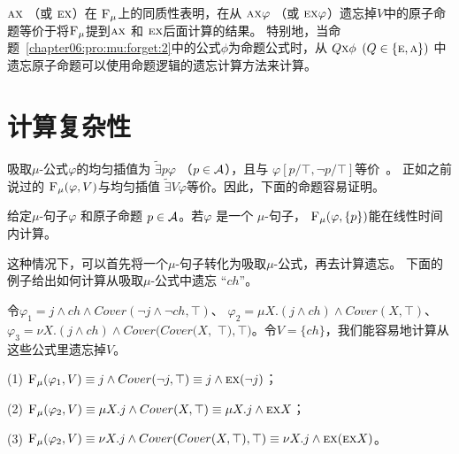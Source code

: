  $\textsc{a}\textsc{x}$ （或 $\textsc{e}\textsc{x}$）在 ${\textsc{F}_{\textsc{$\mu$}}}$上的同质性表明，在从 $\textsc{a}\textsc{x} \varphi$ （或 $\textsc{e}\textsc{x} \varphi$）遗忘掉$V$中的原子命题等价于将${\textsc{F}_{\textsc{$\mu$}}}$提到$\textsc{a}\textsc{x}$ 和 $\textsc{e} \textsc{x}$后面计算的结果。
特别地，当命题~\ref{chapter06:pro:mu:forget:2}中的公式$\phi$为命题公式时，从
$Q\textsc{x} \phi$ $(Q\in \{\textsc{e}, \textsc{a}\})$ 中遗忘原子命题可以使用命题逻辑的遗忘计算方法来计算。

\section{计算复杂性}
吸取$\mu$-公式$\varphi$的均匀插值为 $\widetilde{\exists}p \varphi$ （$p\in {\cal A}$），且与 $\varphi[p/\top,\neg p/\top]$等价~\cite{d2006modal}。
正如之前说过的 ${\textsc{F}_{\textsc{$\mu$}}}(\varphi, V)$与均匀插值 $\widetilde{\exists}V \varphi$等价\cite{d2006modal}。因此，下面的命题容易证明。
\begin{proposition}\label{pro:disLiT}
	给定$\mu$-句子$\varphi$ 和原子命题 $p\in {\cal A}$。若$\varphi$ 是一个 $\mu$-句子， ${\textsc{F}_{\textsc{$\mu$}}}(\varphi, \{p\})$能在线性时间内计算。
\end{proposition}

这种情况下，可以首先将一个$\mu$-句子转化为吸取$\mu$-公式，再去计算遗忘。
下面的例子给出如何计算从吸取$\mu$-公式中遗忘 “$ch$”。
\begin{example}
	令$\varphi_1=  j \wedge ch \wedge Cover(\neg j \wedge \neg ch, \top)$、 $ \varphi_2= \mu X. (j \wedge ch) \wedge Cover(X, \top)$、 $\varphi_3=  \nu X. (j \wedge ch) \wedge Cover(Cover(X,$ $\top), \top)$。令$V=\{ch\}$，我们能容易地计算从这些公式里遗忘掉$V$。
	
	(1) ${\textsc{F}_{\textsc{$\mu$}}}(\varphi_1, V) \equiv j \wedge Cover(\neg j, \top) \equiv j \wedge \textsc{e} \textsc{x}(\neg j)$；
	
	(2) ${\textsc{F}_{\textsc{$\mu$}}}(\varphi_2, V) \equiv \mu X. j  \wedge Cover(X, \top) \equiv \mu X. j \wedge \textsc{e} \textsc{x} X$；
	
	(3) ${\textsc{F}_{\textsc{$\mu$}}}(\varphi_2, V) \equiv \nu X. j \wedge Cover(Cover(X, \top), \top) \equiv \nu X. j \wedge \textsc{e} \textsc{x}(\textsc{e} \textsc{x} X)$。
\end{example}

